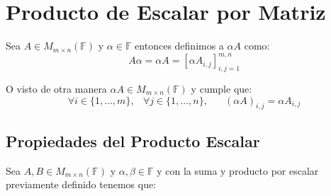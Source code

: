 \documentclass[12pt]{report}                                    %
\DeclareMathOperator \Space {\quad}                             %
\DeclareMathOperator \MiniSpace {\;}                            %
\begin{document}
        \section{Producto de Escalar por Matriz}

            Sea $A \in M_{m \times n}(\mathbb{F})$ y $\alpha \in \mathbb{F}$ entonces 
            definimos a $ \alpha A$ como:
            \begin{equation}
                A \alpha = \alpha A = [\alpha A_{i, j}]_{i, j = 1}^{m, n}
            \end{equation}

            O visto de otra manera $\alpha A \in M_{m \times n}(\mathbb{F})$ y cumple que:
            \begin{equation}
                \forall i \in \{1, \dots, m\} ,\MiniSpace
                    \forall j \in \{1, \dots, n\} ,\Space
                        (\alpha A)_{i, j} = \alpha A_{i, j}
            \end{equation}

            \subsection{Propiedades del Producto Escalar}

                Sea $A, B \in M_{m \times n}(\mathbb{F})$ y $\alpha, \beta \in \mathbb{F}$
                y con la suma y producto por escalar previamente definido tenemos que:
\end{document}
